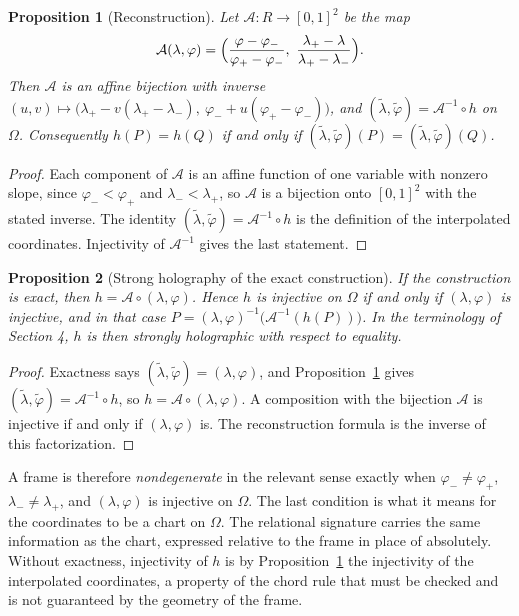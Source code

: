 \documentclass[11pt]{article}
\newtheorem{proposition}{Proposition}
\theoremstyle{remark}
\begin{document}
\begin{proposition}[Reconstruction]\label{prop:recon}
Let $\mathcal A:R\to[0,1]^2$ be the map
\[
\mathcal A(\lambda,\varphi)=\Bigl(\frac{\varphi-\varphi_-}{\varphi_+-\varphi_-},\ \frac{\lambda_+-\lambda}{\lambda_+-\lambda_-}\Bigr).
\]
Then $\mathcal A$ is an affine bijection with inverse $(u,v)\mapsto\bigl(\lambda_+-v(\lambda_+-\lambda_-),\ \varphi_-+u(\varphi_+-\varphi_-)\bigr)$, and $(\tilde\lambda,\tilde\varphi)=\mathcal A^{-1}\circ h$ on $\Omega$. Consequently $h(P)=h(Q)$ if and only if $(\tilde\lambda,\tilde\varphi)(P)=(\tilde\lambda,\tilde\varphi)(Q)$.
\end{proposition}

\begin{proof}
Each component of $\mathcal A$ is an affine function of one variable with nonzero slope, since $\varphi_-<\varphi_+$ and $\lambda_-<\lambda_+$, so $\mathcal A$ is a bijection onto $[0,1]^2$ with the stated inverse. The identity $(\tilde\lambda,\tilde\varphi)=\mathcal A^{-1}\circ h$ is the definition of the interpolated coordinates. Injectivity of $\mathcal A^{-1}$ gives the last statement.
\end{proof}

\begin{proposition}[Strong holography of the exact construction]\label{prop:holo}
If the construction is exact, then $h=\mathcal A\circ(\lambda,\varphi)$. Hence $h$ is injective on $\Omega$ if and only if $(\lambda,\varphi)$ is injective, and in that case $P=(\lambda,\varphi)^{-1}\bigl(\mathcal A^{-1}(h(P))\bigr)$. In the terminology of Section 4, $h$ is then strongly holographic with respect to equality.
\end{proposition}

\begin{proof}
Exactness says $(\tilde\lambda,\tilde\varphi)=(\lambda,\varphi)$, and Proposition~\ref{prop:recon} gives $(\tilde\lambda,\tilde\varphi)=\mathcal A^{-1}\circ h$, so $h=\mathcal A\circ(\lambda,\varphi)$. A composition with the bijection $\mathcal A$ is injective if and only if $(\lambda,\varphi)$ is. The reconstruction formula is the inverse of this factorization.
\end{proof}

A frame is therefore \emph{nondegenerate} in the relevant sense exactly when $\varphi_-\ne\varphi_+$, $\lambda_-\ne\lambda_+$, and $(\lambda,\varphi)$ is injective on $\Omega$. The last condition is what it means for the coordinates to be a chart on $\Omega$. The relational signature carries the same information as the chart, expressed relative to the frame in place of absolutely. Without exactness, injectivity of $h$ is by Proposition~\ref{prop:recon} the injectivity of the interpolated coordinates, a property of the chord rule that must be checked and is not guaranteed by the geometry of the frame.
\end{document}
